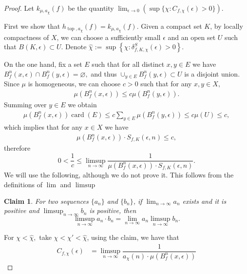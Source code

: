 \documentclass[oneside]{amsart}
\theoremstyle{plain}
\newtheorem*{CLAIME}{Claim}
\theoremstyle{definition}
\DeclareMathOperator{\card}{card}
\newcommand{\<}{\langle}
\renewcommand{\>}{\rangle}
\newcommand{\e}{\epsilon}
\newcommand{\topo}{\operatorname{top}}
\renewcommand{\|}{|\!|} %
\renewcommand{\emptyset}{\varnothing} %
\begin{document}
\begin{proof}
Let $\displaystyle k_{\mu ,a_{\chi }} (f)$ be the quantity $\displaystyle\lim_{\e \to 0} \left(\sup \{ \chi : C_{f,\chi}(\e) > 0 \}\right).$
  
  First we show that $h_{\topo,a_{\chi }} (f) = k_{\mu ,a_{\chi }}(f). $ Given a compact set $K$, by locally compactness of $X$, we can choose a sufficiently small $\e $ and an open set $U$  such that $B (K,\e ) \subset U.$ Denote $ \hat{\chi }:=\sup \left\{ \chi : \delta ^S_{f,K, \chi } (\e ) >0\right\} $. 

  On the one hand, fix a set $E$ such that for all distinct $x,y \in E$ we have $B^n_f(x,\e ) \cap B^n _f (y,\e ) = \emptyset,$  and thus $\cup _{y \in E} B^n_f(y,\e ) \subset U$ is a disjoint union. Since $\mu $ is homogeneous, we can choose $c>0$ such that for any $x,y \in X,$  
  \begin{align*}
    \mu \left( B^n_f (x,\e ) \right) \le c \mu \left( B^n_f (y,\e ) \right) .
  \end{align*}
  Summing over $y \in E$ we obtain 
  \begin{align*}
    \mu \left( B^n_f (x,\e ) \right) \card (E) \le c \sum_{y \in E} \mu \left( B^n_f(y,\e ) \right) \le c \mu (U) \le c,
  \end{align*}
  which implies that for any $x \in X$ we have
  \begin{align*}
    \mu \left( B^n_f (x,\e ) \right) \cdot S_{f,K} (\e,n)  \le c,
  \end{align*}
  therefore 
  \begin{equation*}
      0< \frac{1}{c} \le \limsup_{n\to \infty} \dfrac{1}{ \mu(B_f^n(x,\e))\cdot S_{f,K}(\e,n)}.
  \end{equation*}
  We will use the following, although we do not prove it. This follows from the definitions of $\lim$ and $\limsup$
  \begin{CLAIME}
      For two sequences $\{a_n\}$ and $\{b_n\}$, if $\lim_{n \to \infty} a_n$ exists and it is positive and $\limsup_{n\to \infty} b_n$ is positive, then
      \begin{equation*}
          \limsup_{n \to \infty} a_n \cdot b_n = \lim_{n\to \infty}a_n \limsup_{n \to \infty}b_n.
      \end{equation*}
  \end{CLAIME}
  For $\chi <  \hat{\chi }, $ take $\chi<\chi'<\hat{\chi}$, using the claim, we have that
  \begin{align*}
    C_{f ,\chi }(\e) 
    &= \limsup_{n\to\infty}\dfrac{1}{a_\chi(n) \cdot \mu(B_f^n(x,\e))} 

\end{align*}
\end{proof}
\end{document}
